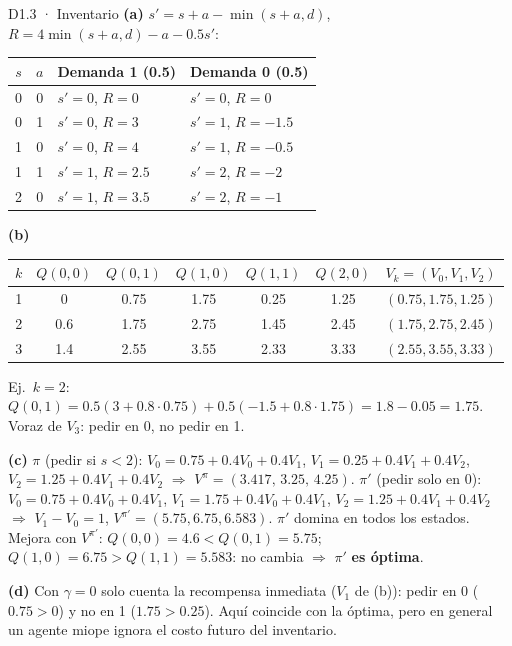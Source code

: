 \begin{solucion}{D1.3 · Inventario}
\textbf{(a)} $s'=s+a-\min(s+a,d)$, $R=4\min(s+a,d)-a-0.5s'$:
\begin{center}\small
\begin{tabular}{cc|ll}
$s$ & $a$ & Demanda 1 (0.5) & Demanda 0 (0.5)\\\hline
0 & 0 & $s'=0$, $R=0$ & $s'=0$, $R=0$\\
0 & 1 & $s'=0$, $R=3$ & $s'=1$, $R=-1.5$\\
1 & 0 & $s'=0$, $R=4$ & $s'=1$, $R=-0.5$\\
1 & 1 & $s'=1$, $R=2.5$ & $s'=2$, $R=-2$\\
2 & 0 & $s'=1$, $R=3.5$ & $s'=2$, $R=-1$
\end{tabular}
\end{center}

\textbf{(b)}
\begin{center}\small
\begin{tabular}{c|cc|cc|c|c}
\toprule
$k$ & $Q(0,0)$ & $Q(0,1)$ & $Q(1,0)$ & $Q(1,1)$ & $Q(2,0)$ & $V_k=(V_0,V_1,V_2)$\\\midrule
1 & 0 & 0.75 & 1.75 & 0.25 & 1.25 & $(0.75,1.75,1.25)$\\
2 & 0.6 & 1.75 & 2.75 & 1.45 & 2.45 & $(1.75,2.75,2.45)$\\
3 & 1.4 & 2.55 & 3.55 & 2.33 & 3.33 & $(2.55,3.55,3.33)$\\\bottomrule
\end{tabular}
\end{center}
Ej.\ $k=2$: $Q(0,1)=0.5(3+0.8\cdot0.75)+0.5(-1.5+0.8\cdot1.75)=1.8-0.05=1.75$. Voraz de $V_3$: pedir en 0, no pedir en 1.

\textbf{(c)} $\pi$ (pedir si $s<2$): $V_0=0.75+0.4V_0+0.4V_1$, $V_1=0.25+0.4V_1+0.4V_2$, $V_2=1.25+0.4V_1+0.4V_2$ $\Rightarrow$ $V^\pi=(3.417,\,3.25,\,4.25)$.
$\pi'$ (pedir solo en 0): $V_0=0.75+0.4V_0+0.4V_1$, $V_1=1.75+0.4V_0+0.4V_1$, $V_2=1.25+0.4V_1+0.4V_2$ $\Rightarrow$ $V_1-V_0=1$, $V^{\pi'}=(\mathbf{5.75},\mathbf{6.75},\mathbf{6.583})$.
$\pi'$ domina en todos los estados. Mejora con $V^{\pi'}$: $Q(0,0)=4.6<Q(0,1)=5.75$; $Q(1,0)=6.75>Q(1,1)=5.583$: no cambia $\Rightarrow$ $\pi'$ \textbf{es óptima}.

\textbf{(d)} Con $\gamma=0$ solo cuenta la recompensa inmediata ($V_1$ de (b)): pedir en 0 ($0.75>0$) y no en 1 ($1.75>0.25$). Aquí coincide con la óptima, pero en
general un agente miope ignora el costo futuro del inventario.
\end{solucion}

